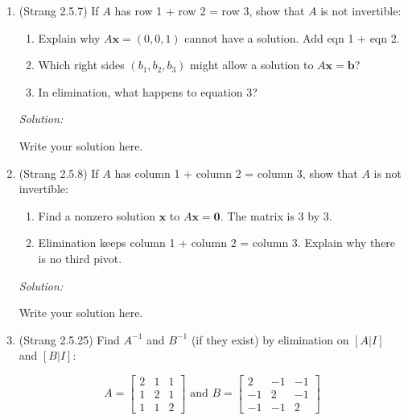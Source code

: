 \documentclass[11pt]{article}
\renewcommand{\vec}[1]{\ensuremath{\mathbf{#1}}}
\newenvironment{sol}
    {\emph{Solution:}
    }
\newcommand{\headings}{
\large{\textbf{YOUR NAME GOES HERE \hfill 21-241 Fall 2019}\\
\textbf{Homework 3 \hfill Due Friday, September 13}}\\
\rule[0.1in]{\textwidth}{0.01in}
}
\begin{document}
\headings

\begin{enumerate}
\section*{Required Problems}

\item (Strang 2.5.7) If $A$ has row 1 + row 2 = row 3, show that $A$ is not invertible:
\begin{enumerate}
\item Explain why $A\vec{x} = (0,0,1)$ cannot have a solution.  Add eqn 1 + eqn 2.
\item Which right sides $(b_1, b_2, b_3)$ might allow a solution to $A\vec{x} = \vec{b}$?
\item In elimination, what happens to equation 3?
\end{enumerate}

\begin{sol}
Write your solution here.
\end{sol}
\clearpage

\item (Strang 2.5.8) If $A$ has column 1 + column 2  = column 3, show that $A$ is not invertible:
\begin{enumerate}
\item Find a nonzero solution $\vec{x}$ to $A\vec{x} = \vec{0}$.  The matrix is 3 by 3.
\item Elimination keeps column 1 + column 2 = column 3.  Explain why there is no third pivot.
\end{enumerate}

\begin{sol}
Write your solution here.
\end{sol}
\clearpage


\item (Strang 2.5.25) Find $A^{-1}$ and $B^{-1}$ (if they exist) by elimination on $[A | I]$ and $[B | I]$:

\[A= \begin{bmatrix} 2 & 1 & 1 \\ 1 & 2 & 1 \\ 1 & 1 & 2 \end{bmatrix} \text{ and } B=  \begin{bmatrix} 2 & -1 & -1 \\ -1 & 2 & -1 \\ -1 & -1 & 2 \end{bmatrix} \]




\end{enumerate}
\end{document}
